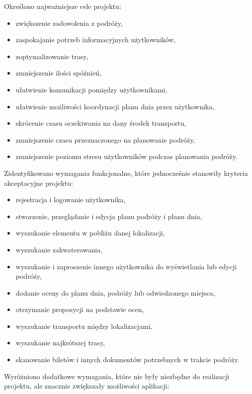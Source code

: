 \documentclass[10pt,twoside,a4paper]{report}
\begin{document}
\par
\noindent \newline Określono najważniejsze cele projektu:

\begin{itemize}
\item zwiększenie zadowolenia z podróży,
\item zaspokajanie potrzeb informacyjnych użytkowników,
\item zoptymalizowanie trasy,
\item zmniejszenie ilości spóźnień,
\item ułatwienie komunikacji pomiędzy użytkownikami,
\item ułatwienie możliwości koordynacji planu dnia przez użytkownika,
\item skrócenie czasu oczekiwania na dany środek transportu,
\item zmniejszenie czasu przeznaczonego na planowanie podróży,
\item zmniejszenie poziomu stresu użytkowników podczas planowania podróży.
\end{itemize}

\par
\noindent\newline Zidentyfikowano wymagania funkcjonalne, które jednocześnie stanowiły kryteria akceptacyjne projektu: 

\begin{itemize}
\item rejestracja i logowanie użytkownika,
\item stworzenie, przeglądanie i edycja planu podróży i planu dnia,
\item wyszukanie elementu w pobliżu danej lokalizacji,
\item wyszukanie zakwaterowania,
\item wyszukanie i zaproszenie innego użytkownika do wyświetlania lub edycji podróży,
\item dodanie oceny do planu dnia, podróży lub odwiedzonego miejsca,
\item otrzymanie propozycji na podstawie ocen,
\item wyszukanie transportu między lokalizacjami,
\item wyszukanie najkrótszej trasy,
\item skanowanie biletów i innych dokumentów potrzebnych w trakcie podróży.
\end{itemize}

\par
\noindent Wyróżniono dodatkowe wymagania, które nie były niezbędne do realizacji projektu, ale znacznie zwiększały możliwości aplikacji: 
\end{document}
